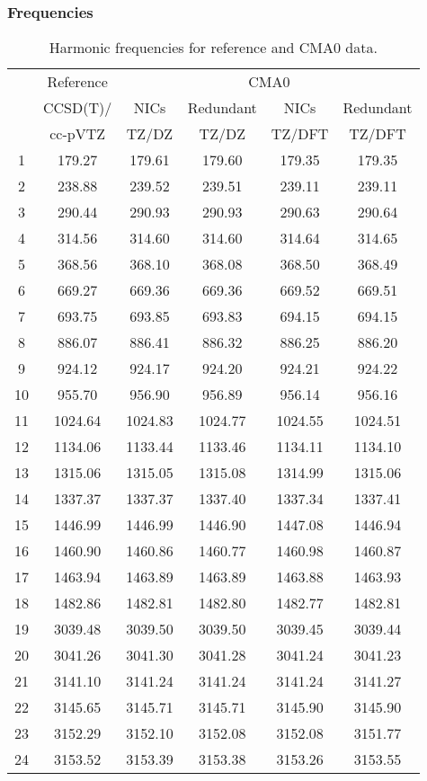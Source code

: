 \documentclass[10pt,oneside]{article}
\begin{document}
\begin{table}[h!]
\subsubsection*{Frequencies}
\centering
\caption{Harmonic frequencies for reference and CMA0 data.}
\begin{tabular}{cccccc}
\toprule
{} & Reference & \multicolumn{4}{c}{CMA0} \\
{} &  CCSD(T)/ &    NICs &  Redundant &    NICs & Redundant \\
{} &   cc-pVTZ &   TZ/DZ &      TZ/DZ &  TZ/DFT &    TZ/DFT \\
\midrule
1  &    179.27 &  179.61 &     179.60 &  179.35 &    179.35 \\
2  &    238.88 &  239.52 &     239.51 &  239.11 &    239.11 \\
3  &    290.44 &  290.93 &     290.93 &  290.63 &    290.64 \\
4  &    314.56 &  314.60 &     314.60 &  314.64 &    314.65 \\
5  &    368.56 &  368.10 &     368.08 &  368.50 &    368.49 \\
6  &    669.27 &  669.36 &     669.36 &  669.52 &    669.51 \\
7  &    693.75 &  693.85 &     693.83 &  694.15 &    694.15 \\
8  &    886.07 &  886.41 &     886.32 &  886.25 &    886.20 \\
9  &    924.12 &  924.17 &     924.20 &  924.21 &    924.22 \\
10 &    955.70 &  956.90 &     956.89 &  956.14 &    956.16 \\
11 &   1024.64 & 1024.83 &    1024.77 & 1024.55 &   1024.51 \\
12 &   1134.06 & 1133.44 &    1133.46 & 1134.11 &   1134.10 \\
13 &   1315.06 & 1315.05 &    1315.08 & 1314.99 &   1315.06 \\
14 &   1337.37 & 1337.37 &    1337.40 & 1337.34 &   1337.41 \\
15 &   1446.99 & 1446.99 &    1446.90 & 1447.08 &   1446.94 \\
16 &   1460.90 & 1460.86 &    1460.77 & 1460.98 &   1460.87 \\
17 &   1463.94 & 1463.89 &    1463.89 & 1463.88 &   1463.93 \\
18 &   1482.86 & 1482.81 &    1482.80 & 1482.77 &   1482.81 \\
19 &   3039.48 & 3039.50 &    3039.50 & 3039.45 &   3039.44 \\
20 &   3041.26 & 3041.30 &    3041.28 & 3041.24 &   3041.23 \\
21 &   3141.10 & 3141.24 &    3141.24 & 3141.24 &   3141.27 \\
22 &   3145.65 & 3145.71 &    3145.71 & 3145.90 &   3145.90 \\
23 &   3152.29 & 3152.10 &    3152.08 & 3152.08 &   3151.77 \\
24 &   3153.52 & 3153.39 &    3153.38 & 3153.26 &   3153.55 \\
\bottomrule
\end{tabular}
\end{table}
\end{document}
